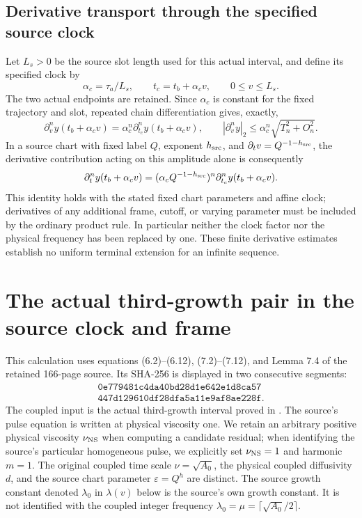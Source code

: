 \documentclass[11pt]{article}
\begin{document}
\subsection{Derivative transport through the specified source clock}

Let $L_s>0$ be the source slot length used for this actual interval,
and define its specified clock by
\[
 \alpha_c=\tau_a/L_s,\qquad
 t_c=t_b+\alpha_c v,\qquad 0\leq v\leq L_s.
\]
The two actual endpoints are retained. Since $\alpha_c$ is constant
for the fixed trajectory and slot, repeated chain differentiation
gives, exactly,
\begin{equation}\label{tgdc:clock}
 \partial_v^ny(t_b+\alpha_cv)
      =\alpha_c^n\partial_{t_c}^ny(t_b+\alpha_cv),\qquad
 |\partial_v^ny|_2\leq\alpha_c^n\sqrt{T_n^2+O_n^2}.
\end{equation}
In a source chart with fixed label $Q$, exponent $h_{\rm src}$,
and $\partial_t v=Q^{-1-h_{\rm src}}$, the derivative contribution
acting on this amplitude alone is consequently
\[
 \partial_t^ny(t_b+\alpha_cv)
  =(\alpha_cQ^{-1-h_{\rm src}})^n
                      \partial_{t_c}^ny(t_b+\alpha_cv).
\]
This identity holds with the stated fixed chart parameters and affine
clock; derivatives of any additional frame, cutoff, or varying
parameter must be included by the ordinary product rule. In particular
neither the clock factor nor the physical frequency has been replaced
by one. These finite derivative estimates establish no uniform
terminal extension for an infinite sequence.


\section{The actual third-growth pair in the source clock and frame}
\label{tgframe:section}

This calculation uses equations (6.2)--(6.12), (7.2)--(7.12), and
Lemma 7.4 of the retained 166-page source. Its SHA-256 is displayed
in two consecutive segments:
\[
\begin{gathered}
\texttt{0e779481c4da40bd28d1e642e1d8ca57}\\
\texttt{447d129610df28dfa5a11e9af8ae228f}.
\end{gathered}
\]
The coupled input is the actual third-growth interval proved in
. The source's pulse
equation is written at physical viscosity one. We retain an arbitrary
positive physical viscosity $\nu_{\rm NS}$ when computing a candidate
residual; when identifying the source's particular homogeneous pulse,
we explicitly set $\nu_{\rm NS}=1$ and harmonic $m=1$.
The original coupled time scale $\nu=\sqrt{A_0}$, the physical coupled
diffusivity $d$, and the source chart parameter $\varepsilon=Q^h$
are distinct.
The source growth constant denoted $\lambda_0$ in $\lambda(v)$ below
is the source's own growth constant. It is not identified with the
coupled integer frequency $\lambda_0=\mu=\lceil\sqrt{A_0}/2\rceil$.
\end{document}
